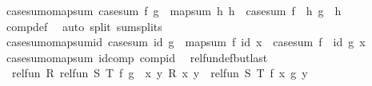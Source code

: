 \begin{isabellebody}
\endisatagproof
{\isafoldproof}%
%
\isadelimproof
\isanewline
%
\endisadelimproof
\isanewline
{}\isamarkupfalse%
\ case{\isacharunderscore}{\kern0pt}sum{\isacharunderscore}{\kern0pt}o{\isacharunderscore}{\kern0pt}map{\isacharunderscore}{\kern0pt}sum{\isacharcolon}{\kern0pt}\ {\isachardoublequoteopen}case{\isacharunderscore}{\kern0pt}sum\ f\ g\ {\isasymcirc}\ map{\isacharunderscore}{\kern0pt}sum\ h{}\ h{}\ {\isacharequal}{\kern0pt}\ case{\isacharunderscore}{\kern0pt}sum\ {\isacharparenleft}{\kern0pt}f\ {\isasymcirc}\ h{}{\isacharparenright}{\kern0pt}\ {\isacharparenleft}{\kern0pt}g\ {\isasymcirc}\ h{}{\isacharparenright}{\kern0pt}{\isachardoublequoteclose}\isanewline
%
\isadelimproof
\ \ %
\endisadelimproof
%
\isatagproof
{}\isamarkupfalse%
\ comp{\isacharunderscore}{\kern0pt}def\ \isamarkupfalse%
\ {\isacharparenleft}{\kern0pt}auto\ split{\isacharcolon}{\kern0pt}\ sum{\isachardot}{\kern0pt}splits{\isacharparenright}{\kern0pt}%
\endisatagproof
{\isafoldproof}%
%
\isadelimproof
\isanewline
%
\endisadelimproof
\isanewline
{}\isamarkupfalse%
\ case{\isacharunderscore}{\kern0pt}sum{\isacharunderscore}{\kern0pt}o{\isacharunderscore}{\kern0pt}map{\isacharunderscore}{\kern0pt}sum{\isacharunderscore}{\kern0pt}id{\isacharcolon}{\kern0pt}\ {\isachardoublequoteopen}{\isacharparenleft}{\kern0pt}case{\isacharunderscore}{\kern0pt}sum\ id\ g\ {\isasymcirc}\ map{\isacharunderscore}{\kern0pt}sum\ f\ id{\isacharparenright}{\kern0pt}\ x\ {\isacharequal}{\kern0pt}\ case{\isacharunderscore}{\kern0pt}sum\ {\isacharparenleft}{\kern0pt}f\ {\isasymcirc}\ id{\isacharparenright}{\kern0pt}\ g\ x{\isachardoublequoteclose}\isanewline
%
\isadelimproof
\ \ %
\endisadelimproof
%
\isatagproof
{}\isamarkupfalse%
\ case{\isacharunderscore}{\kern0pt}sum{\isacharunderscore}{\kern0pt}o{\isacharunderscore}{\kern0pt}map{\isacharunderscore}{\kern0pt}sum\ id{\isacharunderscore}{\kern0pt}comp\ comp{\isacharunderscore}{\kern0pt}id\ \isacommand{{\isachardot}{\kern0pt}{\isachardot}{\kern0pt}}\isamarkupfalse%
%
\endisatagproof
{\isafoldproof}%
%
\isadelimproof
\isanewline
%
\endisadelimproof
\isanewline
{}\isamarkupfalse%
\ rel{\isacharunderscore}{\kern0pt}fun{\isacharunderscore}{\kern0pt}def{\isacharunderscore}{\kern0pt}butlast{\isacharcolon}{\kern0pt}\isanewline
\ \ {\isachardoublequoteopen}rel{\isacharunderscore}{\kern0pt}fun\ R\ {\isacharparenleft}{\kern0pt}rel{\isacharunderscore}{\kern0pt}fun\ S\ T{\isacharparenright}{\kern0pt}\ f\ g\ {\isacharequal}{\kern0pt}\ {\isacharparenleft}{\kern0pt}{\isasymforall}x\ y{\isachardot}{\kern0pt}\ R\ x\ y\ {\isasymlongrightarrow}\ {\isacharparenleft}{\kern0pt}rel{\isacharunderscore}{\kern0pt}fun\ S\ T{\isacharparenright}{\kern0pt}\ {\isacharparenleft}{\kern0pt}f\ x{\isacharparenright}{\kern0pt}\ {\isacharparenleft}{\kern0pt}g\ y{\isacharparenright}{\kern0pt}{\isacharparenright}{\kern0pt}{\isachardoublequoteclose}\isanewline

\end{isabellebody}
